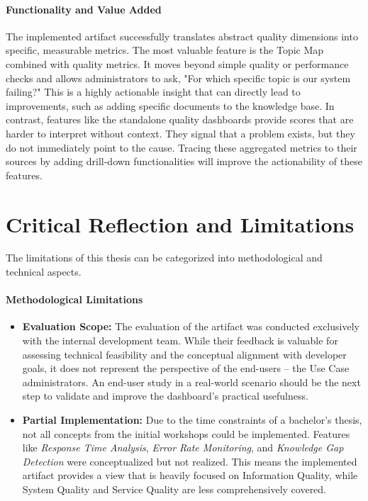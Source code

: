 \documentclass[
	english,
	ruledheaders=section,%
	class=report,%
	thesis={type=bachelor},%
	accentcolor=1b,%
	custommargins=true,%
	marginpar=false,%
	parskip=half-,%
	fontsize=11pt,%
	DIV=14,
]{tudapub}
\begin{document}
\paragraph{Functionality and Value Added} The implemented artifact successfully translates abstract quality dimensions into specific, measurable metrics. The most valuable feature is the Topic Map combined with quality metrics. It moves beyond simple quality or performance checks and allows administrators to ask, "For which specific topic is our system failing?" This is a highly actionable insight that can directly lead to improvements, such as adding specific documents to the knowledge base. In contrast, features like the standalone quality dashboards provide scores that are harder to interpret without context. They signal that a problem exists, but they do not immediately point to the cause. Tracing these aggregated metrics to their sources by adding drill-down functionalities will improve the actionability of these features.

\section{Critical Reflection and Limitations}
The limitations of this thesis can be categorized into methodological and technical aspects.

\paragraph{Methodological Limitations}
\begin{itemize}
    \item \textbf{Evaluation Scope:} The evaluation of the artifact was conducted exclusively with the internal development team. While their feedback is valuable for assessing technical feasibility and the conceptual alignment with developer goals, it does not represent the perspective of the end-users -- the Use Case administrators. An end-user study in a real-world scenario should be the next step to validate and improve the dashboard's practical usefulness.
    \item \textbf{Partial Implementation:} Due to the time constraints of a bachelor's thesis, not all concepts from the initial workshops could be implemented. Features like \textit{Response Time Analysis}, \textit{Error Rate Monitoring}, and \textit{Knowledge Gap Detection} were conceptualized but not realized. This means the implemented artifact provides a view that is heavily focused on Information Quality, while System Quality and Service Quality are less comprehensively covered.
\end{itemize}
\end{document}
